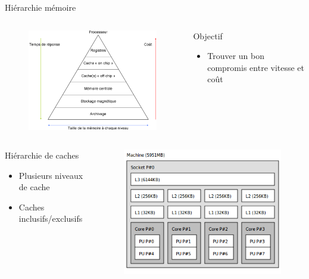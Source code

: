 \begin{frame}{Hiérarchie mémoire}
	\begin{columns}[c]
		\begin{column}{.5\textwidth}
			\begin{figure}[h!]
				\includegraphics[scale=.35]{images/hierarchy.png}
			\end{figure}
		\end{column}
		\begin{column}{.5\textwidth}
			\begin{block}{Objectif}
				\begin{itemize}
					\item{Trouver un bon compromis entre vitesse et coût}
				\end{itemize}
			\end{block}
		\end{column}
	\end{columns}
	\begin{columns}[c]
		\begin{column}{.6\textwidth}
			\begin{block}{Hiérarchie de caches}
				\begin{itemize}
					\item{Plusieurs niveaux de cache}
					\item{Caches inclusifs/exclusifs}
				\end{itemize}
			\end{block}
		\end{column}
		\begin{column}{.4\textwidth}
			\begin{figure}[h!]
				\includegraphics[scale=.3]{images/lstopo.png}

\end{figure}
\end{column}
\end{columns}
\end{frame}
